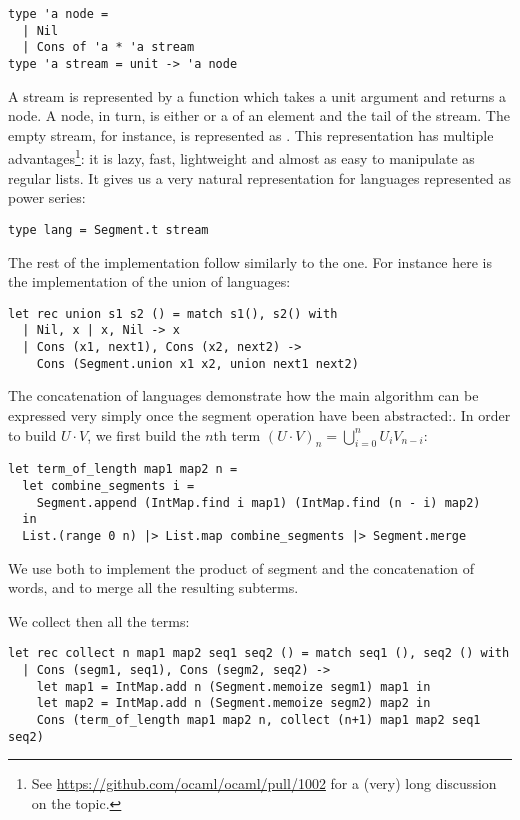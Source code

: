 \begin{lstlisting}
type 'a node =
  | Nil
  | Cons of 'a * 'a stream
type 'a stream = unit -> 'a node
\end{lstlisting}

A stream is represented by a function which takes a unit argument and returns
a node. A node, in turn, is either  or a  of an
element and the tail of the stream. The empty stream, for instance, is
represented as .
This representation has multiple advantages\footnote{See \url{https://github.com/ocaml/ocaml/pull/1002} for a (very) long discussion on the topic.}: it is lazy, fast, lightweight and almost as easy to manipulate as regular lists.
It gives us a very natural representation for languages represented as power series:
\begin{lstlisting}[numbers=none]
type lang = Segment.t stream
\end{lstlisting}

The rest of the implementation follow similarly to the \haskell one. For instance
here is the implementation of the union of languages:
\begin{lstlisting}
let rec union s1 s2 () = match s1(), s2() with
  | Nil, x | x, Nil -> x
  | Cons (x1, next1), Cons (x2, next2) -> 
    Cons (Segment.union x1 x2, union next1 next2)
\end{lstlisting}

The concatenation of languages demonstrate how the main algorithm can
be expressed very simply once the segment operation have been abstracted:.
In order to build $U \cdot V$, we first build the $n$th term
$(U \cdot V)_n = \bigcup_{i=0}^n U_i V_{n-i}$:
\begin{lstlisting}
let term_of_length map1 map2 n =
  let combine_segments i =
    Segment.append (IntMap.find i map1) (IntMap.find (n - i) map2)
  in
  List.(range 0 n) |> List.map combine_segments |> Segment.merge
\end{lstlisting}

We use both  to implement the product
of segment and the concatenation of words, and  to merge
all the resulting subterms.

We collect then all the terms:
\begin{lstlisting}
let rec collect n map1 map2 seq1 seq2 () = match seq1 (), seq2 () with
  | Cons (segm1, seq1), Cons (segm2, seq2) ->
    let map1 = IntMap.add n (Segment.memoize segm1) map1 in 
    let map2 = IntMap.add n (Segment.memoize segm2) map2 in
    Cons (term_of_length map1 map2 n, collect (n+1) map1 map2 seq1 seq2)
\end{lstlisting}

